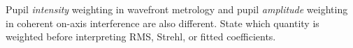 Pupil \emph{intensity} weighting in wavefront metrology and pupil
\emph{amplitude} weighting in coherent on-axis interference are also
different. State which quantity is weighted before interpreting RMS,
Strehl, or fitted coefficients.

